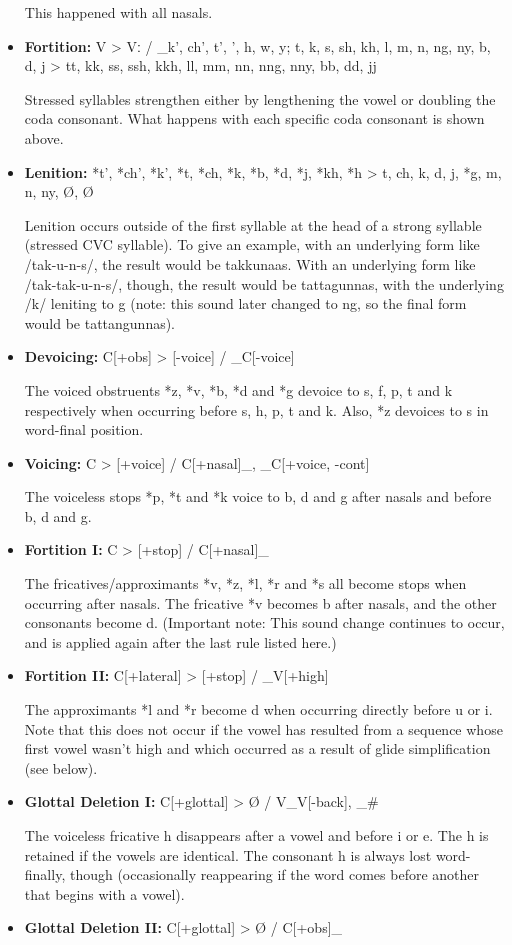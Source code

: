\documentclass[oneside]{book}
\begin{document}
\begin{itemize}
This happened with all nasals.
\item
\textbf{Fortition:}
V > Vː / \_k', ch', t', ', h, w, y; t, k, s, sh, kh, l, m, n, ng, ny, b, d, j > tt, kk, ss, ssh, kkh, ll, mm, nn, nng, nny, bb, dd, jj

Stressed syllables strengthen either by lengthening the vowel or doubling the coda consonant.
What happens with each specific coda consonant is shown above.
\item
\textbf{Lenition:}
*t', *ch', *k', *t, *ch, *k, *b, *d, *j, *kh, *h > t, ch, k, d, j, *g, m, n, ny, Ø, Ø

Lenition occurs outside of the first syllable at the head of a strong syllable (stressed CVC syllable).
To give an example, with an underlying form like /tak-u-n-s/, the result would be takkunaas.
With an underlying form like /tak-tak-u-n-s/, though, the result would be tattagunnas, with the underlying /k/ leniting to g (note: this sound later changed to ng, so the final form would be tattangunnas).
\item
\textbf{Devoicing:}
C[+obs] > [-voice] / \_C[-voice]

The voiced obstruents *z, *v, *b, *d and *g devoice to s, f, p, t and k respectively when occurring before s, h, p, t and k.
Also, *z devoices to s in word-final position.
\item
\textbf{Voicing:}
C > [+voice] / C[+nasal]\_, \_C[+voice, -cont]

The voiceless stops *p, *t and *k voice to b, d and g after nasals and before b, d and g.
\item
\textbf{Fortition I:}
C > [+stop] / C[+nasal]\_

The fricatives/approximants *v, *z, *l, *r and *s all become stops when occurring after nasals.
The fricative *v becomes b after nasals, and the other consonants become d.
(Important note: This sound change continues to occur, and is applied again after the last rule listed here.)
\item
\textbf{Fortition II:}
C[+lateral] > [+stop] / \_V[+high]

The approximants *l and *r become d when occurring directly before u or i.
Note that this does not occur if the vowel has resulted from a sequence whose first vowel wasn't high and which occurred as a result of glide simplification (see below).
\item
\textbf{Glottal Deletion I:}
C[+glottal] > Ø / V\_V[-back], \_\#

The voiceless fricative h disappears after a vowel and before i or e.
The h is retained if the vowels are identical.
The consonant h is always lost word-finally, though (occasionally reappearing if the word comes before another that begins with a vowel).
\item
\textbf{Glottal Deletion II:}
C[+glottal] > Ø / C[+obs]\_


\end{itemize}
\end{document}
